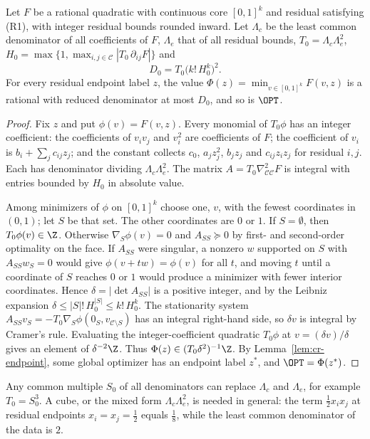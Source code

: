 \begin{lemma}\label{lem:cr-height}
Let $F$ be a rational quadratic with continuous core $[0,1]^k$ and residual
satisfying (R1), with integer residual bounds rounded inward. Let
$\Lambda_c$ be the least common denominator of all coefficients of $F$,
$\Lambda_e$ that of all residual bounds, $T_0=\Lambda_c\Lambda_e^2$,
$H_0=\max\{1,\max_{i,j\in\mathcal C}|T_0\,\partial_{ij}F|\}$ and
\[
D_0=T_0\bigl(k!\,H_0^k\bigr)^2 .
\]
For every residual endpoint label $z$, the value
$\Phi(z)=\min_{v\in[0,1]^k}F(v,z)$ is a rational with reduced denominator
at most $D_0$, and so is $\OPT$.
\end{lemma}
\begin{proof}
Fix $z$ and put $\phi(v)=F(v,z)$. Every monomial of $T_0\phi$ has an
integer coefficient: the coefficients of $v_iv_j$ and $v_i^2$ are
coefficients of $F$; the coefficient of $v_i$ is $b_i+\sum_jc_{ij}z_j$;
and the constant collects $c_0$, $a_jz_j^2$, $b_jz_j$ and $c_{ij}z_iz_j$
for residual $i,j$. Each has denominator dividing $\Lambda_c\Lambda_e^2$.
The matrix $A=T_0\nabla^2_{\mathcal C\mathcal C}F$ is integral with entries
bounded by $H_0$ in absolute value.

Among minimizers of $\phi$ on $[0,1]^k$ choose one, $v$, with the fewest
coordinates in $(0,1)$; let $S$ be that set. The other coordinates are
$0$ or $1$. If $S=\emptyset$, then $T_0\phi(v)\in\Z$. Otherwise
$\nabla_S\phi(v)=0$ and $A_{SS}\succeq0$ by first- and second-order
optimality on the face. If $A_{SS}$ were singular, a nonzero $w$
supported on $S$ with $A_{SS}w_S=0$ would give $\phi(v+tw)=\phi(v)$ for all
$t$, and moving $t$ until a coordinate of $S$ reaches $0$ or $1$ would
produce a minimizer with fewer interior coordinates. Hence
$\delta=|\det A_{SS}|$ is a positive integer, and by the Leibniz expansion
$\delta\le|S|!\,H_0^{|S|}\le k!\,H_0^k$. The stationarity system
$A_{SS}v_S=-T_0\nabla_S\phi(0_S,v_{\mathcal C\setminus S})$ has an integral
right-hand side, so $\delta v$ is integral by Cramer's rule. Evaluating
the integer-coefficient quadratic $T_0\phi$ at $v=(\delta v)/\delta$ gives
an element of $\delta^{-2}\Z$. Thus $\Phi(z)\in(T_0\delta^2)^{-1}\Z$.
By Lemma~\ref{lem:cr-endpoint}, some global optimizer has an endpoint
label $z^*$, and $\OPT=\Phi(z^*)$.
\end{proof}

\begin{remark}
Any common multiple $S_0$ of all denominators can replace $\Lambda_c$ and
$\Lambda_e$, for example $T_0=S_0^3$. A cube, or the mixed form
$\Lambda_c\Lambda_e^2$, is needed in general: the term $\frac12x_ix_j$ at
residual endpoints $x_i=x_j=\frac12$ equals $\frac18$, while the least
common denominator of the data is $2$.
\end{remark}

